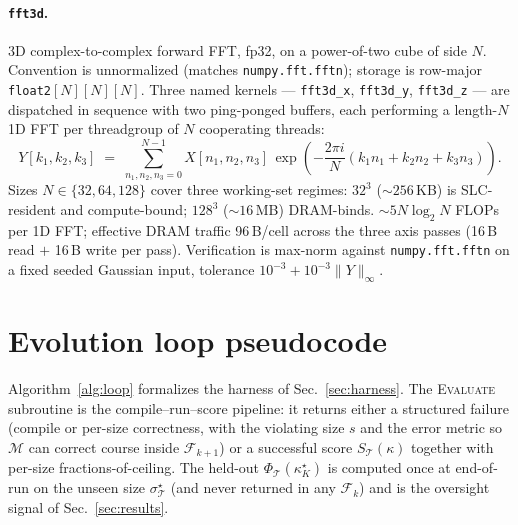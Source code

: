 \documentclass{article}
\theoremstyle{plain}
\theoremstyle{definition}
\theoremstyle{remark}
\begin{document}
\paragraph{\texttt{fft3d}.} 3D complex-to-complex forward FFT, fp32, on a
power-of-two cube of side $N$. Convention is unnormalized (matches
\texttt{numpy.fft.fftn}); storage is row-major
\texttt{float2}$[N][N][N]$. Three named kernels ---
\texttt{fft3d\_x}, \texttt{fft3d\_y}, \texttt{fft3d\_z} --- are
dispatched in sequence with two ping-ponged buffers, each performing
a length-$N$ 1D FFT per threadgroup of $N$ cooperating threads:
\begin{equation}
Y[k_1,k_2,k_3] \;=\; \sum_{n_1,n_2,n_3=0}^{N-1} X[n_1,n_2,n_3]\,
   \exp\!\left(-\frac{2\pi i}{N}(k_1 n_1 + k_2 n_2 + k_3 n_3)\right).
\end{equation}
Sizes $N\in\{32,64,128\}$ cover three working-set regimes: $32^3$
(${\sim}256$\,KB) is SLC-resident and compute-bound; $128^3$
(${\sim}16$\,MB) DRAM-binds. ${\sim}5N\log_2 N$ FLOPs per 1D FFT;
effective DRAM traffic 96\,B/cell across the three axis passes
(16\,B read $+$ 16\,B write per pass). Verification is max-norm
against \texttt{numpy.fft.fftn} on a fixed seeded Gaussian input,
tolerance $10^{-3}{+}10^{-3}\|Y\|_\infty$.

\section{Evolution loop pseudocode}
\label{app:algorithm}

Algorithm~\ref{alg:loop} formalizes the harness of
Sec.~\ref{sec:harness}. The \textsc{Evaluate} subroutine is the
compile--run--score pipeline: it returns either a structured failure
(compile or per-size correctness, with the violating size $s$ and
the error metric so $\mathcal{M}$ can correct course inside
$\mathcal{F}_{k+1}$) or a successful score $S_\mathcal{T}(\kappa)$
together with per-size fractions-of-ceiling. The held-out
$\Phi_\mathcal{T}(\kappa^\star_K)$ is computed once at end-of-run on
the unseen size $\sigma^\star_\mathcal{T}$ (and never returned in any
$\mathcal{F}_k$) and is the oversight signal of
Sec.~\ref{sec:results}.
\end{document}
